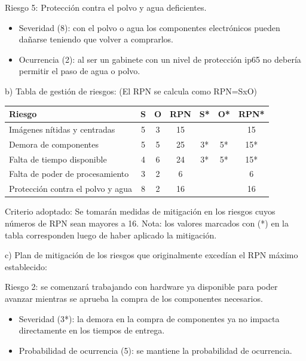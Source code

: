 \documentclass[11pt]{charter}
\begin{document}
Riesgo 5: Protección contra el polvo y agua deficientes.

\begin{itemize}
\item Severidad (8): con el polvo o agua los componentes electrónicos pueden dañarse teniendo que volver a comprarlos. 
\item Ocurrencia (2): al ser un gabinete con un nivel de protección ip65 no debería permitir el paso de agua o polvo.  
\end{itemize}


b) Tabla de gestión de riesgos:      (El RPN se calcula como RPN=SxO)

\begin{table}[htpb]
\centering
\begin{tabularx}{\linewidth}{@{}|X|c|c|c|c|c|c|@{}}
\hline
\rowcolor[HTML]{C0C0C0} 
Riesgo 									& S		& O		& RPN		& S* 	& O* 	& RPN* \\ \hline
Imágenes nítidas y centradas			& 5 	& 3 	& 15  		&    	&    	& 15   \\ \hline
Demora de componentes     				& 5 	& 5 	& 25  		& 3* 	& 5* 	& 15*  \\ \hline
Falta de tiempo disponible    			& 4 	& 6 	& 24  		& 3* 	& 5* 	& 15*  \\ \hline
Falta de poder de procesamiento			& 3 	& 2 	& 6   		&  	 	&    	& 6    \\ \hline
Protección contra el polvo y agua		& 8 	& 2 	& 16		&	 	&    	& 16   \\ \hline
\end{tabularx}%
\end{table}

Criterio adoptado: 
Se tomarán medidas de mitigación en los riesgos cuyos números de RPN sean mayores a 16.
\newline
Nota: los valores marcados con (*) en la tabla corresponden luego de haber aplicado la mitigación.

c) Plan de mitigación de los riesgos que originalmente excedían el RPN máximo establecido:


Riesgo 2: se comenzará trabajando con hardware ya disponible para poder avanzar mientras se aprueba la compra de los componentes necesarios.

\begin{itemize}
\item Severidad (3*): la demora en la compra de componentes ya no impacta directamente en los tiempos de entrega.
\item Probabilidad de ocurrencia (5): se mantiene la probabilidad de ocurrencia.
 \end{itemize}
 
\end{document}
